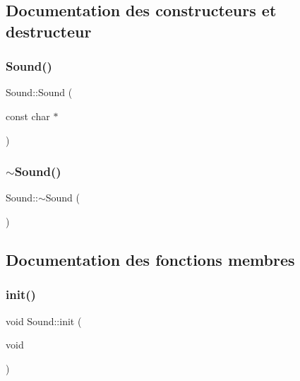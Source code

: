 \subsection{Documentation des constructeurs et destructeur}
\mbox{\label{classSound_ac85830f0d7c950d28141164edc7fe990}} 
\subsubsection{\texorpdfstring{Sound()}{Sound()}}
{\footnotesize\ttfamily Sound\+::\+Sound (\begin{DoxyParamCaption}\item[{const char $\ast$}]{ }\end{DoxyParamCaption})}

\mbox{\label{classSound_a0907389078bf740be2a5763366ad3376}} 
\subsubsection{\texorpdfstring{$\sim$\+Sound()}{~Sound()}}
{\footnotesize\ttfamily Sound\+::$\sim$\+Sound (\begin{DoxyParamCaption}{ }\end{DoxyParamCaption})}



\subsection{Documentation des fonctions membres}
\mbox{\label{classSound_a8f0f9eeae854569f7a7f110e3efec73a}} 
\subsubsection{\texorpdfstring{init()}{init()}}
{\footnotesize\ttfamily void Sound\+::init (\begin{DoxyParamCaption}\item[{void}]{ }\end{DoxyParamCaption})\hspace{0.3cm}{\ttfamily [private]}}

\mbox{\label{classSound_aeaa88e449a4e8f3503628452238d833c}} 
